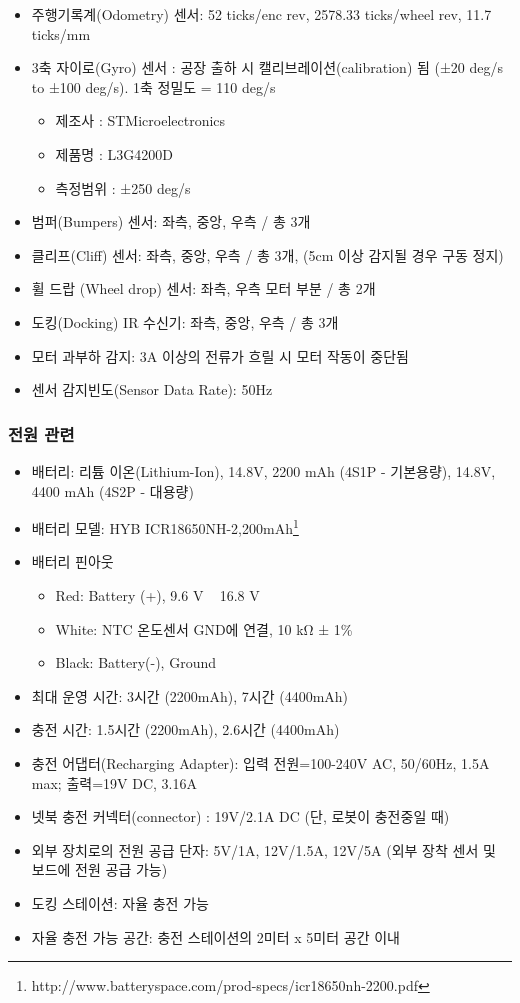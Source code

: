 \begin{itemize}[leftmargin=*]
\item 주행기록계(Odometry) 센서: 52 ticks/enc rev, 2578.33 ticks/wheel rev, 11.7 ticks/mm
\item 3축 자이로(Gyro) 센서
: 공장 출하 시 캘리브레이션(calibration) 됨 (±20 deg/s to ±100 deg/s). 1축 정밀도 = 110 deg/s
  \begin{itemize}
  \item 제조사 : STMicroelectronics
  \item 제품명 : L3G4200D
  \item 측정범위 : ±250 deg/s
  \end{itemize}
\item 범퍼(Bumpers) 센서: 좌측, 중앙, 우측 / 총 3개
\item 클리프(Cliff) 센서: 좌측, 중앙, 우측 / 총 3개, (5cm 이상 감지될 경우 구동 정지)
\item 휠 드랍 (Wheel drop) 센서: 좌측, 우측 모터 부분 / 총 2개
\item 도킹(Docking) IR 수신기: 좌측, 중앙, 우측 / 총 3개
\item 모터 과부하 감지: 3A 이상의 전류가 흐릴 시 모터 작동이 중단됨
\item 센서 감지빈도(Sensor Data Rate): 50Hz
\end{itemize}

\subsubsection{전원 관련}

\begin{itemize}[leftmargin=*]
\item 배터리: 리튬 이온(Lithium-Ion), 14.8V, 2200 mAh (4S1P - 기본용량), 14.8V, 4400 mAh (4S2P - 대용량)
\item 배터리 모델: HYB ICR18650NH-2,200mAh\footnote{http://www.batteryspace.com/prod-specs/icr18650nh-2200.pdf}
\item 배터리 핀아웃
  \begin{itemize}
  \item Red: Battery (+), 9.6 V ~ 16.8 V
  \item White: NTC 온도센서 GND에 연결, 10 kΩ ± 1\%
  \item Black: Battery(-), Ground
  \end{itemize}
\item 최대 운영 시간: 3시간 (2200mAh), 7시간 (4400mAh)
\item 충전 시간: 1.5시간 (2200mAh), 2.6시간 (4400mAh)
\item 충전 어댑터(Recharging Adapter): 입력 전원=100-240V AC, 50/60Hz, 1.5A max; 출력=19V DC, 3.16A
\item 넷북 충전 커넥터(connector) : 19V/2.1A DC (단, 로봇이 충전중일 때)
\item 외부 장치로의 전원 공급 단자: 5V/1A, 12V/1.5A, 12V/5A (외부 장착 센서 및 보드에 전원 공급 가능)
\item 도킹 스테이션: 자율 충전 가능
\item 자율 충전 가능 공간: 충전 스테이션의 2미터 x 5미터 공간 이내
\end{itemize}

